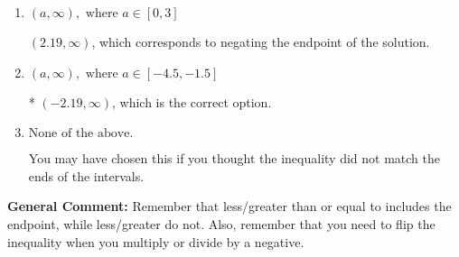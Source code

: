 \documentclass{extbook}[14pt]
\begin{document}
\begin{enumerate}
{\begin{enumerate}[label=\Alph*.]
 $(-\infty, -2.19)$, which corresponds to switching the direction of the interval. You likely did this if you did not flip the inequality when dividing by a negative!
\item \( (a, \infty), \text{ where } a \in [0, 3] \)

 $(2.19, \infty)$, which corresponds to negating the endpoint of the solution.
\item \( (a, \infty), \text{ where } a \in [-4.5, -1.5] \)

* $(-2.19, \infty)$, which is the correct option.
\item \( \text{None of the above}. \)

You may have chosen this if you thought the inequality did not match the ends of the intervals.
\end{enumerate}

\textbf{General Comment:} Remember that less/greater than or equal to includes the endpoint, while less/greater do not. Also, remember that you need to flip the inequality when you multiply or divide by a negative.
}
\end{enumerate}
\end{document}
